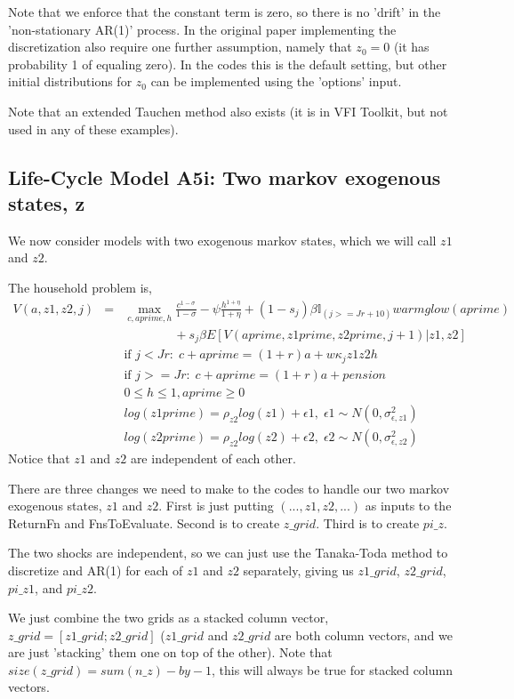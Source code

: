 Note that we enforce that the constant term is zero, so there is no 'drift' in the 'non-stationary AR(1)' process. In the original paper \citep*{FellaGallipoliPan2019} implementing the discretization also require one further assumption, namely that $z_0=0$ (it has probability 1 of equaling zero). In the codes this is the default setting, but other initial distributions for $z_0$ can be implemented using the 'options' input.

Note that an extended Tauchen method also exists (it is in VFI Toolkit, but not used in any of these examples).

\subsection{Life-Cycle Model A5i: Two markov exogenous states, z}
We now consider models with two exogenous markov states, which we will call $z1$ and $z2$.

The household problem is,
\begin{eqnarray*}
 V(a,z1,z2,j)&=& \max_{c,aprime,h} \frac{c^{1-\sigma}}{1-\sigma} - \psi \frac{h^{1+\eta}}{1+\eta} + (1-s_j)\beta  \mathbb{I}_{(j>=Jr+10)} warmglow(aprime)  \\
 && \quad \quad \quad \quad+ s_j \beta E[V(aprime,z1prime,z2prime,j+1)|z1,z2] \\
&& \text{if }j<Jr: \; c+aprime=(1+r)a+w \kappa_j  z1 z2 h \\
&& \text{if }j>=Jr: \; c+aprime=(1+r)a +pension\\
&& 0\leq h \leq 1, aprime\geq 0 \\
&& log(z1prime)=\rho_{z2} log(z1) + \epsilon1, \; \epsilon1 \sim N(0,\sigma_{\epsilon,z1}^2) \\
&& log(z2prime)=\rho_{z2} log(z2) + \epsilon2, \; \epsilon2 \sim N(0,\sigma_{\epsilon,z2}^2)
\end{eqnarray*}
Notice that $z1$ and $z2$ are independent of each other.

There are three changes we need to make to the codes to handle our two markov exogenous states, $z1$ and $z2$. First is just putting $(...,z1,z2,...)$ as inputs to the ReturnFn and FnsToEvaluate. Second is to create $z\_{}grid$. Third is to create $pi\_{}z$.

The two shocks are independent, so we can just use the Tanaka-Toda method to discretize and AR(1) for each of $z1$ and $z2$ separately, giving us $z1\_{}grid$, $z2\_{}grid$, $pi\_{}z1$, and $pi\_{}z2$.

We just combine the two grids as a stacked column vector, $z\_{}grid=[z1\_{}grid; z2\_{}grid]$ ($z1\_{}grid$ and $z2\_{}grid$ are both column vectors, and we are just 'stacking' them one on top of the other). Note that $size(z\_{}grid)=sum(n\_{}z)-by-1$, this will always be true for stacked column vectors.

